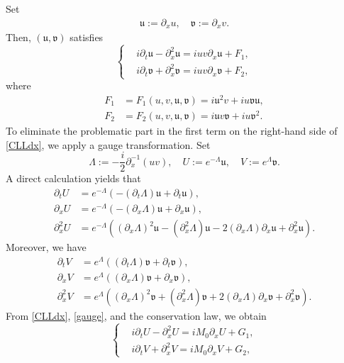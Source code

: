 \documentclass[%
11pt,  reqno]{amsart}
\newcommand{\uu}{\mathfrak u}
\newcommand{\fv}{\mathfrak v}
\newcommand{\Ta}{\Theta}
\newcommand{\Ld}{\Lambda}
\newcommand{\Ft}{{\mathcal{F}}}
\newcommand{\dx}{\partial_x}
\newcommand{\dt}{\partial_t}
\numberwithin{equation}{section}
\numberwithin{theorem}{section}
\begin{document}
Set
\begin{equation*}
\begin{aligned}
\uu := \dx u, \quad \fv := \dx v.  
\end{aligned}
\end{equation*}
Then, $(\uu, \fv)$ satisfies
\begin{equation}
\left\{
\begin{aligned}
&i \dt \uu - \dx^2 \uu = i u v \dx \uu + F_1,
\\
&i \dt \fv + \dx^2 \fv = i u v \dx \fv + F_2,
\end{aligned}
\right.
\label{CLLdx}
\end{equation}
where
\begin{equation}
\begin{aligned}
F_1 &= F_1 (u, v, \uu, \fv)
=
i \uu^2 v + i u \fv \uu,
\\
F_2 &= F_2 (u, v, \uu, \fv)
=
i \uu v \fv + i u \fv^2. 
\end{aligned}
\label{d:F} 
\end{equation}
To eliminate the problematic part in the first term on the right-hand side of \eqref{CLLdx},
we apply a gauge transformation.
Set
\begin{equation}
\Ld := - \frac i2  \dx^{-1} (u v),
\quad U := e^{-\Ld} \uu, \quad V:= e^\Ld \fv.  
\label{gauge}
\end{equation}
A direct calculation yields that
\[
\begin{aligned}
\dt U &= e^{-\Ld} ( - (\dt \Ld) \uu + \dt \uu ),
\\
\dx U &= e^{-\Ld} ( - (\dx \Ld) \uu + \dx \uu ),
\\
\dx^2 U &= e^{-\Ld} ( (\dx \Ld)^2 \uu - (\dx^2 \Ld) \uu - 2 (\dx \Ld) \dx \uu + \dx^2 \uu).
\end{aligned}
\]
Moreover, we have
\[
\begin{aligned}
\dt V &= e^\Ld ( (\dt \Ld) \fv + \dt \fv ),
\\
\dx V &= e^\Ld ( (\dx \Ld) \fv + \dx \fv ),
\\
\dx^2 V &= e^\Ld ((\dx \Ld)^2 \fv + (\dx^2 \Ld) \fv + 2 (\dx \Ld) \dx \fv + \dx^2 \fv).
\end{aligned}
\]
From \eqref{CLLdx}, \eqref{gauge}, and the conservation law, we obtain
\begin{equation*}
\left\{
\begin{aligned}
&i \dt U - \dx^2 U  
= i M_0 \dx U 
+ G_1,
\\
&i \dt V + \dx^2 V 
= i M_0 \dx V 
+ G_2,
\end{aligned}
\right.
\end{equation*}
\end{document}

